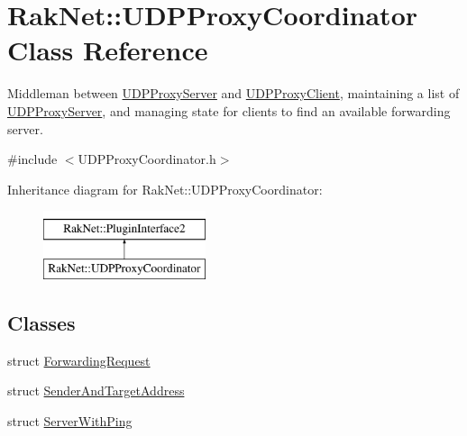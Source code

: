 \hypertarget{class_rak_net_1_1_u_d_p_proxy_coordinator}{\section{Rak\-Net\-:\-:U\-D\-P\-Proxy\-Coordinator Class Reference}
\label{class_rak_net_1_1_u_d_p_proxy_coordinator}
}


Middleman between \hyperlink{class_rak_net_1_1_u_d_p_proxy_server}{U\-D\-P\-Proxy\-Server} and \hyperlink{class_rak_net_1_1_u_d_p_proxy_client}{U\-D\-P\-Proxy\-Client}, maintaining a list of \hyperlink{class_rak_net_1_1_u_d_p_proxy_server}{U\-D\-P\-Proxy\-Server}, and managing state for clients to find an available forwarding server.  




{\ttfamily \#include $<$U\-D\-P\-Proxy\-Coordinator.\-h$>$}

Inheritance diagram for Rak\-Net\-:\-:U\-D\-P\-Proxy\-Coordinator\-:\begin{figure}[H]
\begin{center}
\leavevmode
\includegraphics[height=2.000000cm]{class_rak_net_1_1_u_d_p_proxy_coordinator}
\end{center}
\end{figure}
\subsection*{Classes}
\begin{DoxyCompactItemize}
\item 
struct \hyperlink{struct_rak_net_1_1_u_d_p_proxy_coordinator_1_1_forwarding_request}{Forwarding\-Request}
\item 
struct \hyperlink{struct_rak_net_1_1_u_d_p_proxy_coordinator_1_1_sender_and_target_address}{Sender\-And\-Target\-Address}
\item 
struct \hyperlink{struct_rak_net_1_1_u_d_p_proxy_coordinator_1_1_server_with_ping}{Server\-With\-Ping}
\end{DoxyCompactItemize}
